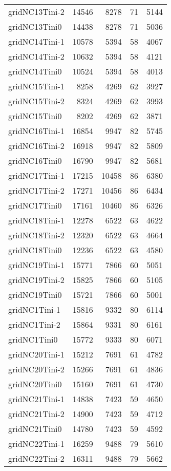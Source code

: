 \begin{longtable}{lrrrr}
gridNC13Tini-2 & 14546 & 8278 & 71 & 5144 \\
gridNC13Tini0 & 14438 & 8278 & 71 & 5036 \\
gridNC14Tini-1 & 10578 & 5394 & 58 & 4067 \\
gridNC14Tini-2 & 10632 & 5394 & 58 & 4121 \\
gridNC14Tini0 & 10524 & 5394 & 58 & 4013 \\
gridNC15Tini-1 & 8258 & 4269 & 62 & 3927 \\
gridNC15Tini-2 & 8324 & 4269 & 62 & 3993 \\
gridNC15Tini0 & 8202 & 4269 & 62 & 3871 \\
gridNC16Tini-1 & 16854 & 9947 & 82 & 5745 \\
gridNC16Tini-2 & 16918 & 9947 & 82 & 5809 \\
gridNC16Tini0 & 16790 & 9947 & 82 & 5681 \\
gridNC17Tini-1 & 17215 & 10458 & 86 & 6380 \\
gridNC17Tini-2 & 17271 & 10456 & 86 & 6434 \\
gridNC17Tini0 & 17161 & 10460 & 86 & 6326 \\
gridNC18Tini-1 & 12278 & 6522 & 63 & 4622 \\
gridNC18Tini-2 & 12320 & 6522 & 63 & 4664 \\
gridNC18Tini0 & 12236 & 6522 & 63 & 4580 \\
gridNC19Tini-1 & 15771 & 7866 & 60 & 5051 \\
gridNC19Tini-2 & 15825 & 7866 & 60 & 5105 \\
gridNC19Tini0 & 15721 & 7866 & 60 & 5001 \\
gridNC1Tini-1 & 15816 & 9332 & 80 & 6114 \\
gridNC1Tini-2 & 15864 & 9331 & 80 & 6161 \\
gridNC1Tini0 & 15772 & 9333 & 80 & 6071 \\
gridNC20Tini-1 & 15212 & 7691 & 61 & 4782 \\
gridNC20Tini-2 & 15266 & 7691 & 61 & 4836 \\
gridNC20Tini0 & 15160 & 7691 & 61 & 4730 \\
gridNC21Tini-1 & 14838 & 7423 & 59 & 4650 \\
gridNC21Tini-2 & 14900 & 7423 & 59 & 4712 \\
gridNC21Tini0 & 14780 & 7423 & 59 & 4592 \\
gridNC22Tini-1 & 16259 & 9488 & 79 & 5610 \\
gridNC22Tini-2 & 16311 & 9488 & 79 & 5662 \\

\end{longtable}
